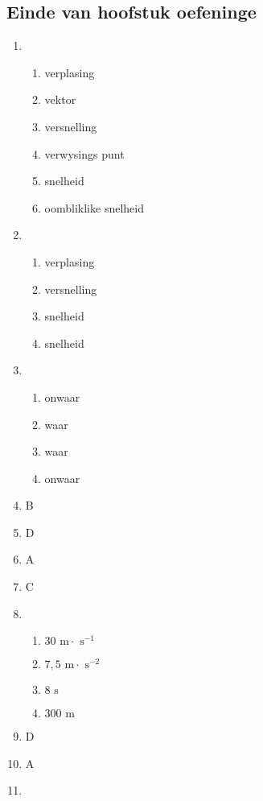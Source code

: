 \subsection{Einde van hoofstuk oefeninge}
\begin{multicols}{3}
 \begin{enumerate}[noitemsep, label=\textbf{(\arabic*)} ]
  \item 
\begin{enumerate}[noitemsep, label=\textbf{(\alph*)} ]
 \item verplasing
\item vektor
\item versnelling
\item verwysings punt
\item snelheid
\item oombliklike snelheid
\end{enumerate}
\item 
\begin{enumerate}[noitemsep, label=\textbf{(\alph*)} ]
 \item verplasing
\item versnelling
\item snelheid
\item snelheid
\end{enumerate}
\item 
\begin{enumerate}[noitemsep, label=\textbf{(\alph*)} ]
 \item onwaar
\item waar
\item waar
\item onwaar
\end{enumerate}
\item B 
\item D
\item A
\item C
\item 
\begin{enumerate}[noitemsep, label=\textbf{(\alph*)} ]
 \item $30 \text{ m} \cdot \text{ s}^{-1}$
\item $7,5 \text{ m} \cdot \text{ s}^{-2}$
\item $8 \text{ s}$
\item $300 \text{ m}$
\end{enumerate}
\item D
\item A
\item 
\begin{enumerate}[noitemsep, label=\textbf{(\alph*)} ]

\end{enumerate}
\end{enumerate}
\end{multicols}
